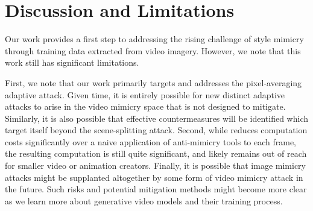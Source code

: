 \section{Discussion and Limitations}
\label{sec:discussion}

Our work provides a first step to addressing the rising challenge of style
mimicry through training data extracted from video imagery. However, we note
that this work still has significant limitations.

First, we note that our work primarily targets and addresses the
pixel-averaging adaptive attack. Given time, it is entirely possible for new
distinct adaptive attacks to arise in the video mimicry space that \system{}
is not designed to mitigate. Similarly, it is also possible that effective
countermeasures will be identified which target \system{} itself beyond the
scene-splitting attack. Second, while \system{} reduces computation costs
significantly over a naive application of anti-mimicry tools to each frame,
the resulting computation is still quite significant, and likely remains out
of reach for smaller video or animation creators.  Finally, it is possible
that image mimicry attacks might be supplanted altogether by some form of
video mimicry attack in the future. Such risks and potential mitigation
methods might become more clear as we learn more about generative video
models and their training process.

